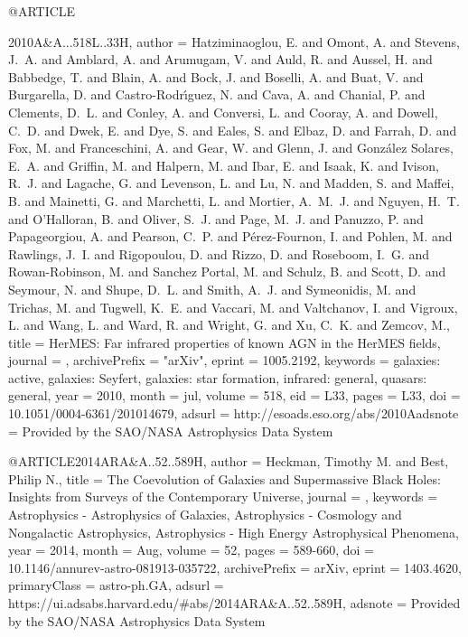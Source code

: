 \documentclass[longauth]{aa}
\begin{document}
@ARTICLE{2010A&A...518L..33H,
   author = {{Hatziminaoglou}, E. and {Omont}, A. and {Stevens}, J.~A. and {Amblard}, A. and {Arumugam}, V. and {Auld}, R. and {Aussel}, H. and {Babbedge}, T. and {Blain}, A. and {Bock}, J. and {Boselli}, A. and {Buat}, V. and {Burgarella}, D. and {Castro-Rodr{\'{\i}}guez}, N. and {Cava}, A. and {Chanial}, P. and {Clements}, D.~L. and {Conley}, A. and {Conversi}, L. and {Cooray}, A. and {Dowell}, C.~D. and {Dwek}, E. and {Dye}, S. and {Eales}, S. and {Elbaz}, D. and {Farrah}, D. and	{Fox}, M. and {Franceschini}, A. and {Gear}, W. and {Glenn}, J. and {Gonz{\'a}lez Solares}, E.~A. and {Griffin}, M. and {Halpern}, M. and {Ibar}, E. and {Isaak}, K. and {Ivison}, R.~J. and {Lagache}, G. and {Levenson}, L. and {Lu}, N. and {Madden}, S. and {Maffei}, B. and {Mainetti}, G. and {Marchetti}, L. and {Mortier}, A.~M.~J. and {Nguyen}, H.~T. and {O'Halloran}, B. and {Oliver}, S.~J. and {Page}, M.~J. and {Panuzzo}, P. and {Papageorgiou}, A. and {Pearson}, C.~P. and {P{\'e}rez-Fournon}, I. and {Pohlen}, M. and {Rawlings}, J.~I. and	{Rigopoulou}, D. and {Rizzo}, D. and {Roseboom}, I.~G. and {Rowan-Robinson}, M. and {Sanchez Portal}, M. and {Schulz}, B. and {Scott}, D. and {Seymour}, N. and {Shupe}, D.~L. and {Smith}, A.~J. and {Symeonidis}, M. and {Trichas}, M. and {Tugwell}, K.~E. and {Vaccari}, M. and {Valtchanov}, I. and {Vigroux}, L. and {Wang}, L. and {Ward}, R. and {Wright}, G. and	{Xu}, C.~K. and {Zemcov}, M.},
    title = {HerMES: Far infrared properties of known AGN in the HerMES fields},
  journal = {\aap},
archivePrefix = "arXiv",
   eprint = {1005.2192},
 keywords = {galaxies: active, galaxies: Seyfert, galaxies: star formation, infrared: general, quasars: general},
     year = 2010,
    month = jul,
   volume = 518,
      eid = {L33},
    pages = {L33},
      doi = {10.1051/0004-6361/201014679},
   adsurl = {http://esoads.eso.org/abs/2010Aadsnote = {Provided by the SAO/NASA Astrophysics Data System}
  }
  
@ARTICLE{2014ARA&A..52..589H,
       author = {{Heckman}, Timothy M. and {Best}, Philip N.},
        title = {The Coevolution of Galaxies and Supermassive Black Holes: Insights from Surveys of the Contemporary Universe},
      journal = {\araa},
     keywords = {Astrophysics - Astrophysics of Galaxies, Astrophysics - Cosmology and Nongalactic Astrophysics, Astrophysics - High Energy Astrophysical Phenomena},
         year = 2014,
        month = Aug,
       volume = {52},
        pages = {589-660},
          doi = {10.1146/annurev-astro-081913-035722},
archivePrefix = {arXiv},
       eprint = {1403.4620},
 primaryClass = {astro-ph.GA},
       adsurl = {https://ui.adsabs.harvard.edu/#abs/2014ARA&A..52..589H},
      adsnote = {Provided by the SAO/NASA Astrophysics Data System}
}

}
\end{document}
